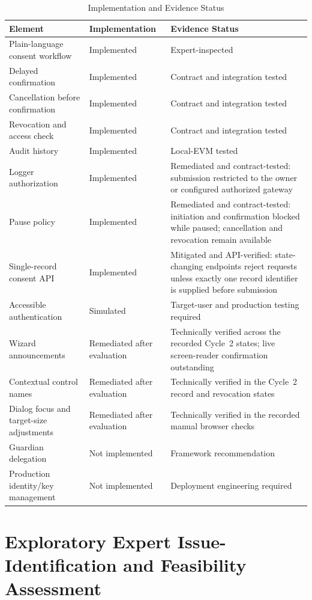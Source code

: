 \documentclass[journal]{IEEEtran}
\begin{document}
\begin{table}[!t]
\caption{Implementation and Evidence Status}
\label{tab:implementation-evidence}
\centering
\footnotesize
\setlength{\tabcolsep}{2.5pt}
\begin{tabularx}{\columnwidth}{L L L}
\toprule
\textbf{Element} & \textbf{Implementation} & \textbf{Evidence Status} \\
\midrule
Plain-language consent workflow & Implemented & Expert-inspected \\
Delayed confirmation & Implemented & Contract and integration tested \\
Cancellation before confirmation & Implemented & Contract and integration tested \\
Revocation and access check & Implemented & Contract and integration tested \\
Audit history & Implemented & Local-EVM tested \\
Logger authorization & Implemented & Remediated and contract-tested: submission restricted to the owner or configured authorized gateway \\
Pause policy & Implemented & Remediated and contract-tested: initiation and confirmation blocked while paused; cancellation and revocation remain available \\
Single-record consent API & Implemented & Mitigated and API-verified: state-changing endpoints reject requests unless exactly one record identifier is supplied before submission \\
Accessible authentication & Simulated & Target-user and production testing required \\
Wizard announcements & Remediated after evaluation & Technically verified across the recorded Cycle~2 states; live screen-reader confirmation outstanding \\
Contextual control names & Remediated after evaluation & Technically verified in the Cycle~2 record and revocation states \\
Dialog focus and target-size adjustments & Remediated after evaluation & Technically verified in the recorded manual browser checks \\
Guardian delegation & Not implemented & Framework recommendation \\
Production identity/key management & Not implemented & Deployment engineering required \\
\bottomrule
\end{tabularx}
\end{table}
\section{Exploratory Expert Issue-Identification and Feasibility Assessment}
\label{sec:feasibility}
\end{document}
